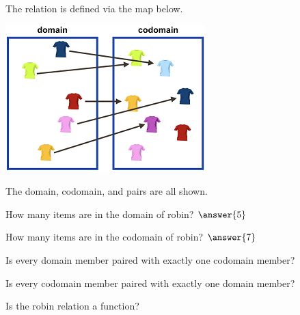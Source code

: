 \documentclass{ximera}
\begin{document}
  
  \begin{definition}
The relation  is defined via the map below.

  \includegraphics[width=292px,height=215px]{pics/r7.png}
  
  The domain, codomain, and pairs are all shown.


  
  \end{definition}
  


\begin{exercise}
How many items are in the domain of robin? $\answer{5}$
\end{exercise}


\begin{exercise}
How many items are in the codomain of robin? $\answer{7}$
\end{exercise}




\begin{exercise}
Is every domain member paired with exactly one codomain member?

  \begin{multipleChoice}
  \end{multipleChoice}
\end{exercise}


\begin{exercise}
Is every codomain member paired with exactly one domain member?

  \begin{multipleChoice}
  \end{multipleChoice}
\end{exercise}



\begin{exercise}
Is the robin relation a function?

  \begin{multipleChoice}
  \end{multipleChoice}
\end{exercise}
\end{document}
